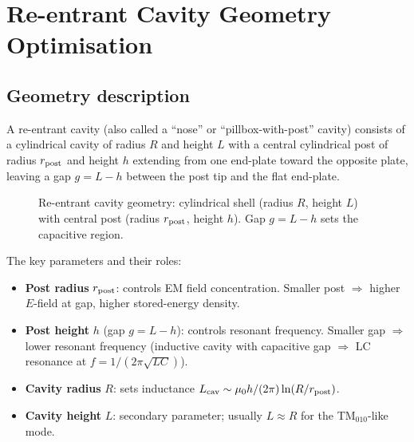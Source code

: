 \documentclass[11pt,twocolumn]{article}
\begin{document}
\section{Re-entrant Cavity Geometry Optimisation}
\label{sec:reentrant}

\subsection{Geometry description}
\label{sec:reentrant_geometry}

A re-entrant cavity (also called a ``nose'' or ``pillbox-with-post'' cavity)
consists of a cylindrical cavity of radius $R$ and height $L$ with a central
cylindrical post of radius $r_{\rm post}$ and height $h$ extending from one
end-plate toward the opposite plate, leaving a gap $g = L - h$ between the
post tip and the flat end-plate.

\begin{figure}[h!]
\centering
%
%
\caption{Re-entrant cavity geometry: cylindrical shell (radius $R$, height $L$)
with central post (radius $r_{\rm post}$, height $h$).
Gap $g = L-h$ sets the capacitive region.}
\label{fig:reentrant}
\end{figure}

The key parameters and their roles:
\begin{itemize}[nosep]
\item \textbf{Post radius} $r_{\rm post}$: controls EM field concentration.
  Smaller post $\Rightarrow$ higher $E$-field at gap, higher stored-energy density.
\item \textbf{Post height} $h$ (gap $g = L-h$): controls resonant frequency.
  Smaller gap $\Rightarrow$ lower resonant frequency (inductive cavity with
  capacitive gap $\Rightarrow$ LC resonance at $f = 1/(2\pi\sqrt{LC})$).
\item \textbf{Cavity radius} $R$: sets inductance $L_{\rm cav}\sim\mu_0 h/(2\pi)
  \ln(R/r_{\rm post})$.
\item \textbf{Cavity height} $L$: secondary parameter; usually $L \approx R$
  for the TM$_{010}$-like mode.
\end{itemize}
\end{document}
